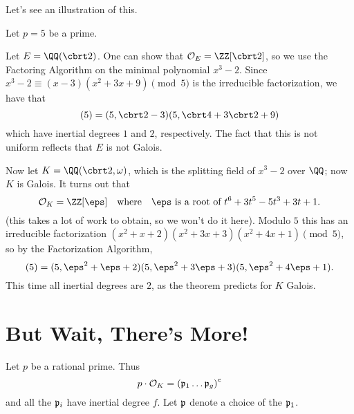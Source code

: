 Let's see an illustration of this.
\begin{example}
	Let $p = 5$ be a prime.
	\begin{enumerate}[(a)]
		\ii Let $E = \QQ(\cbrt2)$.
		One can show that $\OO_E = \ZZ[\cbrt2]$, so 
		we use the Factoring Algorithm on the minimal polynomial $x^3-2$.
		Since $x^3-2 \equiv (x-3)(x^2+3x+9) \pmod 5$ is the irreducible factorization,
		we have that
		\[ (5) = (5,\cbrt2-3)(5, \cbrt4+3\cbrt2+9) \]
		which have inertial degrees $1$ and $2$, respectively.
		The fact that this is not uniform reflects that $E$ is not Galois.

		\ii Now let $K = \QQ(\cbrt2,\omega)$, which is the splitting
		field of $x^3-2$ over $\QQ$; now $K$ is Galois.
		It turns out that
		\[ \OO_K = \ZZ[\eps] \quad\text{where}\quad \eps \text { is a root of } t^6+3t^5-5t^3+3t+1. \]
		(this takes a lot of work to obtain, so we won't do it here).
		Modulo $5$ this has an irreducible factorization
		$(x^2+x+2)(x^2+3x+3)(x^2+4x+1) \pmod 5$,
		so by the Factorization Algorithm,
		\[ (5) = (5, \eps^2+\eps+2)(5, \eps^2+3\eps+3)(5, \eps^2+4\eps+1). \]
		This time all inertial degrees are $2$, as the theorem predicts for $K$ Galois.
	\end{enumerate}
\end{example}

\section{But Wait, There's More!}
Let $p$ be a rational prime.
Thus
\[ p \cdot \mathcal O_K = \left( \mathfrak p_1 \dots \mathfrak p_g \right)^e \]
and all the $\mathfrak p_i$ have inertial degree $f$.
Let $\mathfrak p$ denote a choice of the $\mathfrak p_1$.

